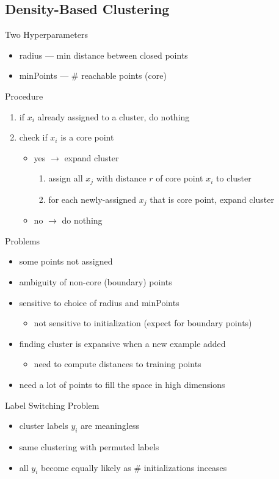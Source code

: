 \documentclass[10pt,landscape,a4paper]{article}
\begin{document}
\begin{multicols*}{5}
\subsection{Density-Based Clustering}
Two Hyperparameters
\begin{itemize}
    \item radius --- min distance between closed points
    \item minPoints --- \# reachable points (core)
\end{itemize}
Procedure
\begin{enumerate}
    \item if \(x_i\) already assigned to a cluster, do nothing
    \item check if \(x_i\) is a core point
    \begin{itemize}
        \item yes \(\rightarrow \) expand cluster
        \begin{enumerate}[label=\arabic*]
            \item assign all \(x_j\) with distance \(r\) of core point \(x_i\) to cluster
            \item for each newly-assigned \(x_j\) that is core point, expand cluster
        \end{enumerate}
        \item no  \(\rightarrow \) do nothing
    \end{itemize}
\end{enumerate}
Problems
\begin{itemize}
    \item some points not assigned
    \item ambiguity of non-core (boundary) points
    \item sensitive to choice of radius and minPoints
    \begin{itemize}
        \item not sensitive to initialization (expect for boundary points)
    \end{itemize}
    \item finding cluster is expansive when a new example added
    \begin{itemize}
        \item need to compute distances to training points
    \end{itemize}
    \item need a lot of points to fill the space in high dimensions
\end{itemize}
Label Switching Problem \\
\begin{itemize}
    \item cluster labels \(y_i\) are meaningless
    \item same clustering with permuted labels
    \item all \(y_i\) become equally likely as \# initializations inceases
\end{itemize}


\end{multicols*}
\end{document}
